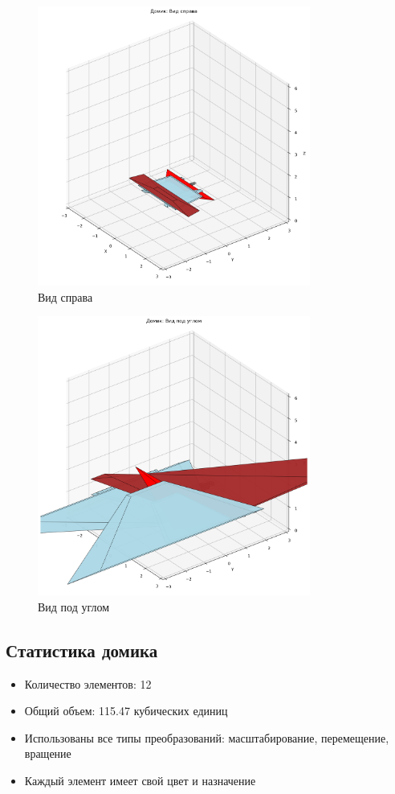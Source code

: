 \begin{figure}[H]
\centering
\includegraphics[width=0.8\textwidth]{images/task8/house_right.png}
\caption{Вид справа}
\end{figure}

\begin{figure}[H]
\centering
\includegraphics[width=0.8\textwidth]{images/task8/house_angle.png}
\caption{Вид под углом}
\end{figure}

\subsection*{Статистика домика}
\begin{itemize}
    \item Количество элементов: 12
    \item Общий объем: 115.47 кубических единиц
    \item Использованы все типы преобразований: масштабирование, перемещение, вращение
    \item Каждый элемент имеет свой цвет и назначение
\end{itemize}

